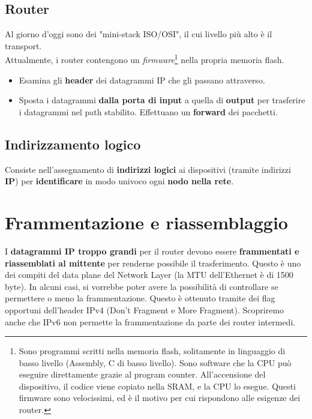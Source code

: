 \subsection{Router}
Al giorno d'oggi sono dei "mini-stack ISO/OSI", il cui livello più alto è il transport.\\
Attualmente, i router contengono un \textit{firmware}\footnote{Sono programmi scritti nella memoria flash, solitamente in linguaggio di basso livello (Assembly, C di basso livello). Sono software che la CPU può eseguire direttamente grazie al program counter. All'accensione del dispositivo, il codice viene copiato nella SRAM, e la CPU lo esegue. Questi firmware sono velocissimi, ed è il motivo per cui rispondono alle esigenze dei router.} nella propria memoria flash.
\begin{itemize}
	\item Esamina gli \textbf{header} dei datagrammi IP che gli passano attraverso.
	\item Sposta i datagrammi \textbf{dalla porta di input} a quella di \textbf{output} per trasferire i datagrammi nel path stabilito. Effettuano un \textbf{forward} dei pacchetti.
\end{itemize}

\subsection{Indirizzamento logico}
Consiste nell'assegnamento di \textbf{indirizzi logici} ai dispositivi (tramite indirizzi \textbf{IP}) per \textbf{identificare} in modo univoco ogni \textbf{nodo nella rete}.

\section{Frammentazione e riassemblaggio}
I \textbf{datagrammi IP troppo grandi} per il router devono essere \textbf{frammentati e riassemblati al mittente} per renderne possibile il trasferimento. Questo è uno dei compiti del data plane del Network Layer (la MTU dell'Ethernet è di 1500 byte). In alcuni casi, si vorrebbe poter avere la possibilità di controllare se permettere o meno la frammentazione. Questo è ottenuto tramite dei flag opportuni dell'header IPv4 (Don't Fragment e More Fragment). Scopriremo anche che IPv6 non permette la frammentazione da parte dei router intermedi.


